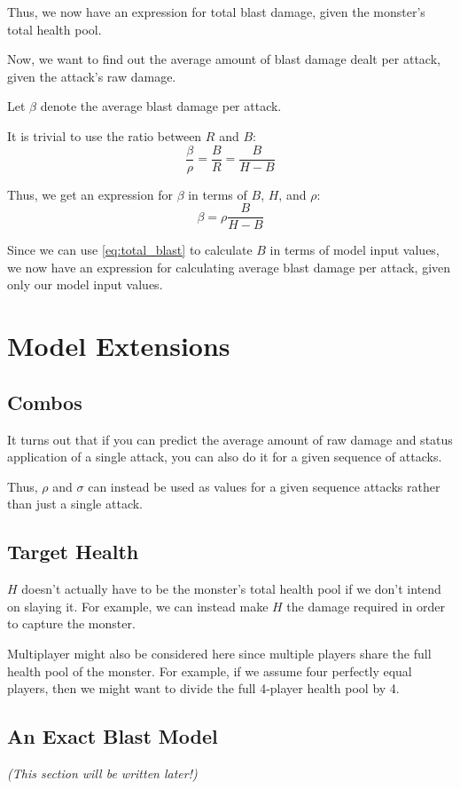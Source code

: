 \documentclass{article}
\begin{document}
Thus, we now have an expression for total blast damage, given the monster's total health pool.

Now, we want to find out the average amount of blast damage dealt per attack, given the attack's raw damage.

Let $\beta$ denote the average blast damage per attack.

It is trivial to use the ratio between $R$ and $B$:
\begin{equation}
    \frac{\beta}{\rho}
    = \frac{B}{R}
    = \frac{B}{H - B} 
\end{equation}

Thus, we get an expression for $\beta$ in terms of $B$, $H$, and $\rho$:
\begin{equation}
    \beta = \rho \frac{B}{H - B}
\end{equation}

Since we can use \eqref{eq:total_blast} to calculate $B$ in terms of model input values, we now have an expression for calculating average blast damage per attack, given only our model input values.


\section{Model Extensions}%
\label{sec:model_extensions}

\subsection{Combos}%
\label{sub:combos}

It turns out that if you can predict the average amount of raw damage and status application of a single attack, you can also do it for a given sequence of attacks.

Thus, $\rho$ and $\sigma$ can instead be used as values for a given sequence attacks rather than just a single attack.


\subsection{Target Health}%
\label{sub:target_health}

$H$ doesn't actually have to be the monster's total health pool if we don't intend on slaying it. For example, we can instead make $H$ the damage required in order to capture the monster.

Multiplayer might also be considered here since multiple players share the full health pool of the monster. For example, if we assume four perfectly equal players, then we might want to divide the full 4-player health pool by 4.


\subsection{An Exact Blast Model}%
\label{sub:exact_blast_model}

\textit{(This section will be written later!)}
\end{document}
